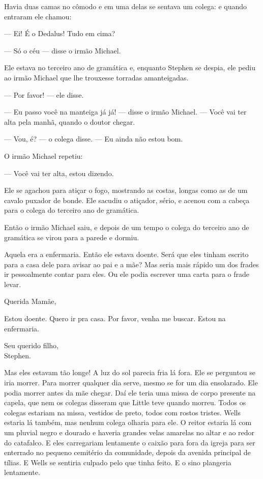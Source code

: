 Havia duas camas no cômodo e em uma delas se sentava um colega: e quando
entraram ele chamou:

 --- Ei! É o Dedalus! Tudo em cima?

 --- Só o céu --- disse o irmão Michael.

Ele estava no terceiro ano de gramática e, enquanto Stephen se despia,
ele pediu ao irmão Michael que lhe trouxesse torradas amanteigadas.

 --- Por favor! --- ele disse.

 --- Eu passo você na manteiga já já! --- disse o irmão Michael. --- Você vai ter alta pela manhã, quando o doutor chegar.

 --- Vou, é? --- o colega disse. --- Eu ainda não estou bom.

O irmão Michael repetiu:

 --- Você vai ter alta, estou dizendo.

Ele se agachou para atiçar o fogo, mostrando as costas, longas como as de
um cavalo puxador de bonde. Ele sacudiu o atiçador, sério, e acenou com
a cabeça para o colega do terceiro ano de gramática.

Então o irmão Michael saiu, e depois de um tempo o colega do terceiro
ano de gramática se virou para a parede e dormiu.

Aquela era a enfermaria. Então ele estava doente. Será que eles tinham
escrito para a casa dele para avisar ao pai e a mãe? Mas seria mais
rápido um dos frades ir pessoalmente contar para eles. Ou ele podia
escrever uma carta para o frade levar.

\smallskip

Querida Mamãe,

Estou doente. Quero ir pra casa. Por favor, venha me buscar. Estou na
enfermaria.

{\raggedleft
Seu querido filho,\\
Stephen.
\par}

\smallskip

Mas eles estavam tão longe! A luz do sol parecia fria lá fora. Ele se
perguntou se iria morrer. Para morrer qualquer dia serve, mesmo se for
um dia ensolarado. Ele podia morrer antes da mãe chegar. Daí ele teria
uma missa de corpo presente na capela, que nem os colegas disseram que
Little teve quando morreu. Todos os colegas estariam na missa, vestidos
de preto, todos com rostos tristes. Wells estaria lá também, mas nenhum
colega olharia para ele. O reitor estaria lá com um pluvial negro e
dourado e haveria grandes velas amarelas no altar e ao redor do
catafalco. E eles carregariam lentamente o caixão para fora da igreja
para ser enterrado no pequeno cemitério da comunidade, depois da
avenida principal de tílias. E Wells se sentiria culpado pelo que tinha
feito. E o sino plangeria lentamente.

